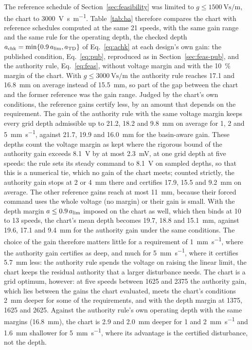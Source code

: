 The reference schedule of Section~\ref{sec:feasibility} was limited to $g\le\SI{1500}{\volt\second\per\metre}$, the chart to \SI{3000}{\volt\second\per\metre}. Table~\ref{tab:ba} therefore compares the chart with reference schedules computed at the same 21 speeds, with the same gain range and the same rule for the operating depth, the checked depth $a_{\mathrm{chk}}=\min\{0.9\,a_{\lim},a_{\mathrm{TD}}\}$ of Eq.~\eqref{eq:achk} at each design's own gain: the published condition, Eq.~\eqref{eq:pub}, reproduced as in Section~\ref{sec:feas-pub}, and the authority rule, Eq.~\eqref{eq:feas}, without voltage margin and with the \SI{10}{\percent} margin of the chart. With $g\le\SI{3000}{\volt\second\per\metre}$ the authority rule reaches 17.1 and \SI{16.8}{\milli\metre} on average instead of \SI{15.5}{\milli\metre}, so part of the gap between the chart and the former reference was the gain range. Judged by the chart's own conditions, the reference gains certify less, by an amount that depends on the requirement. The gain of the authority rule with the same voltage margin keeps every grid depth admissible up to 21.2, 18.2 and \SI{9.8}{\milli\metre} on average for 1, 2 and \SI{5}{\milli\metre\per\second}, against 21.7, 19.9 and \SI{16.0}{\milli\metre} for the basin-aware gain. These depths count the voltage margin as kept where the rigorous bound of the authority gain exceeds \SI{8.1}{\volt} by at most \SI{2.3}{\milli\volt}, at one grid depth at five speeds: the rule sets its steady command to \SI{8.1}{\volt} on sampled depths, so that this is a numerical tie, which no gain of the chart meets; counted strictly, the authority gain stops at 2 or \SI{4}{\milli\metre} there and certifies 17.9, 15.5 and \SI{9.2}{\milli\metre} on average. The other reference gains reach at most \SI{11}{\milli\metre}, because their forced command uses the whole voltage (no margin) or their gain is small. With the depth margin $a\le0.9\,a_{\lim}$ imposed on the chart as well, which then binds at 10 to 13 speeds, the chart's mean depth becomes 19.7, 18.8 and \SI{15.1}{\milli\metre}, against 19.6, 17.1 and \SI{9.4}{\milli\metre} for the authority gain under the same conditions. The choice of the gain therefore matters little for a requirement of \SI{1}{\milli\metre\per\second}, where the authority gain certifies as deep, and much for \SI{5}{\milli\metre\per\second}, where it certifies \SI{5.7}{\milli\metre} less: the authority rule spends the voltage on raising the linear limit, the chart keeps the residual authority that a larger disturbance needs. The chart is a grid optimum, however: at five speeds between 1625 and \SI{2375}{\rpm} the authority gain, which lies between the gains the chart evaluated, meets the chart's conditions \SI{2}{\milli\metre} deeper for some of the requirements, and with the depth margin at 1375, 1625 and \SI{2625}{\rpm}. Against the authority rule's own operating depth with the same margins (\SI{16.8}{\milli\metre}), the chart is 2.9 and \SI{2.0}{\milli\metre} deeper for 1 and \SI{2}{\milli\metre\per\second} and \SI{1.6}{\milli\metre} shallower for \SI{5}{\milli\metre\per\second}, where its advantage is the certified disturbance, not the depth.

